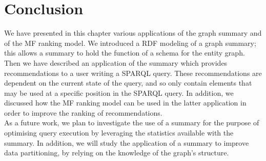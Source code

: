 \section{Conclusion}

We have presented in this chapter various applications of the graph summary and of the MF ranking model. We introduced a RDF modeling of a graph summary; this allows a summary to hold the function of a schema for the entity graph. Then we have described an application of the summary which provides recommendations to a user writing a SPARQL query. These recommendations are dependent on the current state of the query, and so only contain elements that may be used at a specific position in the SPARQL query. In addition, we discussed how the MF ranking model can be used in the latter application in order to improve the ranking of recommendations.\\

As a future work, we plan to investigate the use of a summary for the purpose of optimising query execution by leveraging the statistics available with the summary. In addition, we will study the application of a summary to improve data partitioning, by relying on the knowledge of the graph's structure.
